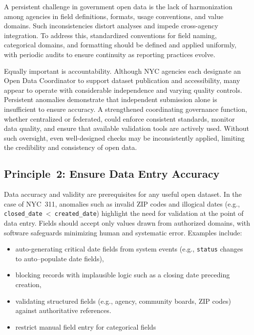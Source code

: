 \documentclass[linenumber]{jdsart}
\begin{document}
A persistent challenge in government open data is the lack of harmonization
among agencies in field definitions, formats, usage conventions, and value
domains. Such inconsistencies distort analyses and impede cross-agency
integration. To address this, standardized conventions for field naming,
categorical domains, and formatting should be defined and applied uniformly,
with periodic audits to ensure continuity as reporting practices evolve.

Equally important is accountability. Although NYC agencies each designate an
Open Data Coordinator to support dataset publication and accessibility, many
appear to operate with considerable independence and varying quality controls.
Persistent anomalies demonstrate that independent submission alone is
insufficient to ensure accuracy. A strengthened coordinating governance
function, whether centralized or federated, could enforce consistent standards,
monitor data quality, and ensure that available validation tools are actively
used. Without such oversight, even well-designed checks may be inconsistently
applied, limiting the credibility and consistency of open data.

\subsection{Principle~2: Ensure Data Entry Accuracy}
\label{subsec:principle2}

Data accuracy and validity are prerequisites for any useful open dataset. In
the case of NYC~311, anomalies such as invalid ZIP codes and illogical dates
(e.g., \texttt{closed\_date}~\textless~\texttt{created\_date}) highlight the
need for validation at the point of data entry. Fields should accept only values
drawn from authorized domains, with software safeguards minimizing human and
systematic error. Examples include:

\begin{itemize}[left=1.5em]
  \item auto-generating critical date fields from system events (e.g., \texttt{status} changes to 
  auto--populate date fields),
  \item blocking records with implausible logic such as a closing date preceding creation,
  \item validating structured fields (e.g., agency, community boards, ZIP codes) against authoritative references.
  \item restrict manual field entry for categorical fields
\end{itemize}
\end{document}
